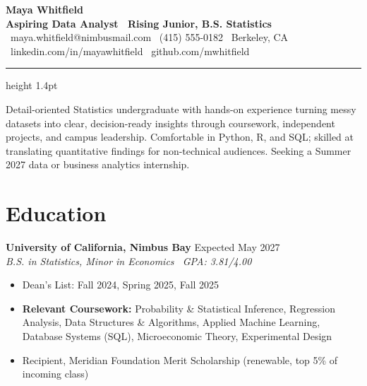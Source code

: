 \documentclass[10pt,letterpaper]{article}
\newcommand{\rolehead}[3]{%
  \noindent\textbf{\color{inkNavy}#1} \hfill {\color{slateGray}\small #2}\\
  {\small\itshape\color{slateGray}#3}\par\vspace{2pt}
}
\begin{document}
\small

\begin{center}
  {\fontsize{25}{28}\selectfont\bfseries\color{inkNavy} Maya Whitfield}\\[3pt]
  {\large\color{accentTeal}\bfseries Aspiring Data Analyst \textbar\ Rising Junior, B.S. Statistics}\\[6pt]
  {\small\color{slateGray}
    \faEnvelope\ maya.whitfield@nimbusmail.com \quad\textbar\quad
    \faPhone\ (415) 555-0182 \quad\textbar\quad
    \faMapMarker\ Berkeley, CA \quad\textbar\quad
    \faLinkedin\ linkedin.com/in/mayawhitfield \quad\textbar\quad
    \faGithub\ github.com/mwhitfield
  }
\end{center}

\vspace{-4pt}
{\color{accentTeal}\hrule height 1.4pt}
\vspace{2pt}

\noindent\small
Detail-oriented Statistics undergraduate with hands-on experience turning messy datasets into
clear, decision-ready insights through coursework, independent projects, and campus leadership.
Comfortable in Python, R, and SQL; skilled at translating quantitative findings for
non-technical audiences. Seeking a Summer 2027 data or business analytics internship.


\section{Education}
\rolehead{University of California, Nimbus Bay}{Expected May 2027}{B.S. in Statistics, Minor in Economics \textbar\ GPA: 3.81/4.00}
\vspace{-2pt}
\begin{itemize}
  \item Dean's List: Fall 2024, Spring 2025, Fall 2025
  \item \textbf{Relevant Coursework:} Probability \& Statistical Inference, Regression Analysis,
        Data Structures \& Algorithms, Applied Machine Learning, Database Systems (SQL),
        Microeconomic Theory, Experimental Design
  \item Recipient, Meridian Foundation Merit Scholarship (renewable, top 5\% of incoming class)
\end{itemize}

\end{document}
